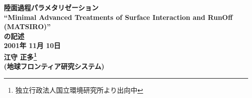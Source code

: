 \documentclass[12pt,a4paper,onecolumn]{jarticle}
\author{}
\begin{document}
\begin{center}
{\LARGE \bf
陸面過程パラメタリゼーション\\
``Minimal Advanced Treatments of Surface Interaction and RunOff
(MATSIRO)''\\
の記述
}
\bigskip \\
{\Large \bf
2001年 11月 10日 \medskip\\
江守 正多\footnote{独立行政法人国立環境研究所より出向中}
\\
(地球フロンティア研究システム)
\bigskip \\
}
\end{center}
%
	\maketitle
	\tableofcontents
	\clearpage
	
\end{document}
